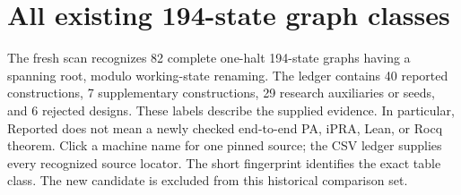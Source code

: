 \section{All existing 194-state graph classes}
The fresh scan recognizes 82 complete one-halt 194-state graphs having a spanning root, modulo working-state renaming. The ledger contains 40 reported constructions, 7 supplementary constructions, 29 research auxiliaries or seeds, and 6 rejected designs. These labels describe the supplied evidence. In particular, Reported does not mean a newly checked end-to-end PA, iPRA, Lean, or Rocq theorem. Click a machine name for one pinned source; the CSV ledger supplies every recognized source locator. The short fingerprint identifies the exact table class. The new candidate is excluded from this historical comparison set.
\begingroup
\small
\setlength{\tabcolsep}{4pt}
\setlength{\LTleft}{0pt}
\setlength{\LTright}{0pt}
\renewcommand{\arraystretch}{1.08}
